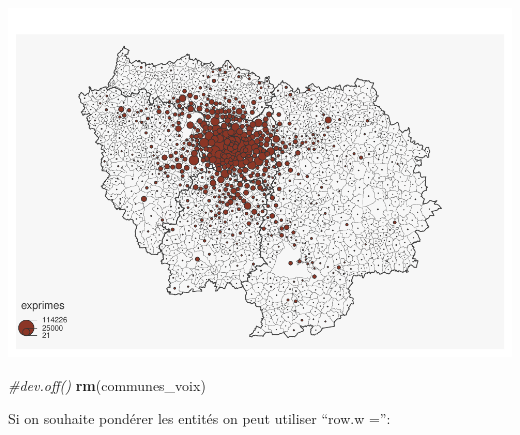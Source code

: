 \documentclass[
]{book}
\newenvironment{Shaded}{\begin{snugshade}}{\end{snugshade}}
\newcommand{\AttributeTok}[1]{\textcolor[rgb]{0.13,0.29,0.53}{#1}}
\newcommand{\CommentTok}[1]{\textcolor[rgb]{0.56,0.35,0.01}{\textit{#1}}}
\newcommand{\ConstantTok}[1]{\textcolor[rgb]{0.56,0.35,0.01}{#1}}
\newcommand{\DecValTok}[1]{\textcolor[rgb]{0.00,0.00,0.81}{#1}}
\newcommand{\FunctionTok}[1]{\textcolor[rgb]{0.13,0.29,0.53}{\textbf{#1}}}
\newcommand{\NormalTok}[1]{#1}
\newcommand{\OtherTok}[1]{\textcolor[rgb]{0.56,0.35,0.01}{#1}}
\newcommand{\SpecialCharTok}[1]{\textcolor[rgb]{0.81,0.36,0.00}{\textbf{#1}}}
\begin{document}
\includegraphics{manuel_geo_quanti_files/figure-latex/unnamed-chunk-59-1.pdf}

\begin{Shaded}
\begin{Highlighting}[]
\CommentTok{\#dev.off()}
\FunctionTok{rm}\NormalTok{(communes\_voix)}
\end{Highlighting}
\end{Shaded}

Si on souhaite pondérer les entités on peut utiliser ``row.w ='':

\begin{Shaded}
\end{Shaded}
\end{document}
